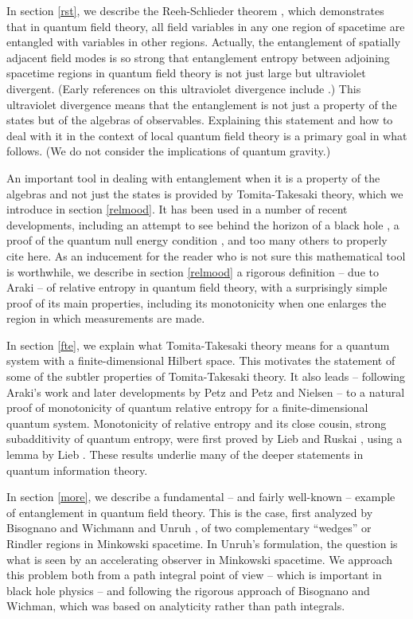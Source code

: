\documentclass[12pt]{article}
\numberwithin{equation}{section}
\begin{document}
In section \ref{rst}, we describe the Reeh-Schlieder theorem \cite{RS}, which demonstrates that in quantum field theory,
all field variables in any one region of
spacetime are entangled with variables in other regions.   Actually,  the entanglement of spatially adjacent field modes
is so strong that entanglement entropy between adjoining
spacetime regions in quantum field theory  is not just large but ultraviolet divergent.   (Early references on this ultraviolet
divergence include \cite{BKLS, Sred, SU,McG,CW,HLW}.)   This ultraviolet divergence means that the entanglement is not just a property of the states but of the algebras
of observables.  Explaining  this statement  and how to deal with it in the context of local quantum
field theory is a primary goal in what follows.   (We do not consider the implications of quantum gravity.)


An important tool in dealing with entanglement when it is a property of the algebras and not just the states is provided by Tomita-Takesaki
theory, which we introduce in section \ref{relmood}.    It has been used in a number of recent developments, 
including an attempt to see behind the horizon of a black hole \cite{PapaRaju}, a proof of the quantum null energy 
condition \cite{Faulkner}, and too many others to properly cite here.   
As an inducement for the reader who is not sure this mathematical tool is worthwhile,
we describe in section \ref{relmood} a rigorous definition -- due to Araki \cite{Araki,Araki2} -- of relative entropy in quantum field theory, with a surprisingly
simple proof of its main properties, including its monotonicity when one enlarges the region in which measurements are made.

In section \ref{fte}, we explain what Tomita-Takesaki theory means for a quantum system with a finite-dimensional Hilbert space.
This motivates the statement of some of the subtler properties of Tomita-Takesaki theory.  It also leads -- following Araki's work and  later
developments by Petz \cite{Petz} and Petz and Nielsen \cite{PetzNielsen} -- to a natural proof of monotonicity of quantum relative
entropy for a finite-dimensional quantum system.  Monotonicity of relative entropy and its close cousin, strong subadditivity of quantum 
entropy, were first proved by Lieb and Ruskai \cite{LiebRuskai}, using a lemma by Lieb \cite{Lieb}.   These results underlie many of the
deeper statements in quantum information theory.

In section \ref{more}, we describe a fundamental -- and fairly well-known -- example of entanglement in quantum field theory.
This is the case, first analyzed by Bisognano and Wichmann \cite{BiWi} and Unruh \cite{Unruh}, of two complementary  ``wedges'' or
Rindler regions in Minkowski spacetime.   In Unruh's formulation, the question is what is seen by an accelerating observer in Minkowski
spacetime.   We approach this problem both from a path integral point of view -- which is important in
black hole physics \cite{GibbonsHawking}  -- and following the  rigorous approach of Bisognano and Wichman, which was based on analyticity rather than path integrals.  
\end{document}
